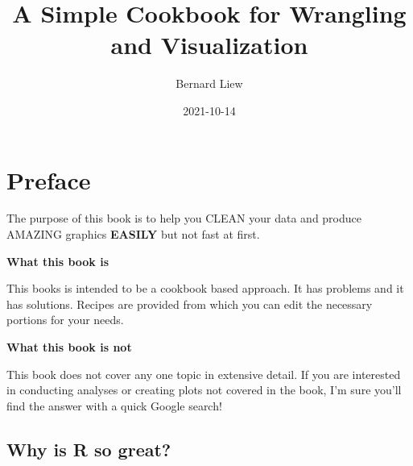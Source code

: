\documentclass[
]{book}
\title{A Simple Cookbook for Wrangling and Visualization}
\author{Bernard Liew}
\date{2021-10-14}
\begin{document}
\maketitle

{
\setcounter{tocdepth}{1}
\tableofcontents
}
\hypertarget{intro}{%
\chapter{Preface}\label{intro}}

The purpose of this book is to help you CLEAN your data and produce AMAZING graphics \textbf{EASILY} but not fast at first.

\textbf{What this book is}

This books is intended to be a cookbook based approach. It has problems and it has solutions. Recipes are provided from which you can edit the necessary portions for your needs.

\textbf{What this book is not}

This book does not cover any one topic in extensive detail. If you are interested in conducting analyses or creating plots not covered in the book, I'm sure you'll find the answer with a quick Google search!

\hypertarget{why-is-r-so-great}{%
\section{Why is R so great?}\label{why-is-r-so-great}}
\end{document}
